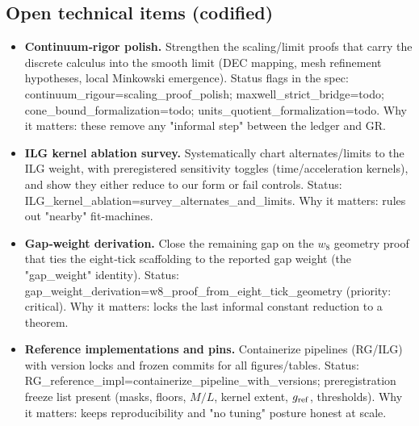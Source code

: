 \documentclass[11pt]{article}
\begin{document}
\subsection{Open technical items (codified)}
\begin{itemize}
  \item \textbf{Continuum‑rigor polish.} Strengthen the scaling/limit proofs that carry the discrete calculus into the smooth limit (DEC mapping, mesh refinement hypotheses, local Minkowski emergence). Status flags in the spec: continuum\_rigour=scaling\_proof\_polish; maxwell\_strict\_bridge=todo; cone\_bound\_formalization=todo; units\_quotient\_formalization=todo. Why it matters: these remove any "informal step" between the ledger and GR.
  \item \textbf{ILG kernel ablation survey.} Systematically chart alternates/limits to the ILG weight, with preregistered sensitivity toggles (time/acceleration kernels), and show they either reduce to our form or fail controls. Status: ILG\_kernel\_ablation=survey\_alternates\_and\_limits. Why it matters: rules out "nearby" fit‑machines.
  \item \textbf{Gap‑weight derivation.} Close the remaining gap on the $w_8$ geometry proof that ties the eight‑tick scaffolding to the reported gap weight (the "gap\_weight" identity). Status: gap\_weight\_derivation=w8\_proof\_from\_eight\_tick\_geometry (priority: critical). Why it matters: locks the last informal constant reduction to a theorem.
  \item \textbf{Reference implementations and pins.} Containerize pipelines (RG/ILG) with version locks and frozen commits for all figures/tables. Status: RG\_reference\_impl=containerize\_pipeline\_with\_versions; preregistration freeze list present (masks, floors, $M/L$, kernel extent, $g_{\rm ref}$, thresholds). Why it matters: keeps reproducibility and "no tuning" posture honest at scale.
\end{itemize}
\end{document}
